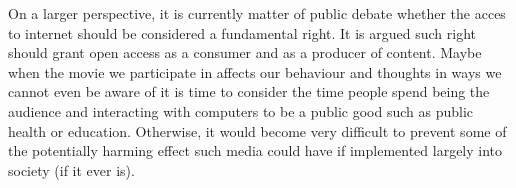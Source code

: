 \documentclass[
		twoside,openright,titlepage,numbers=noenddot,manychapters,
		headinclude,%
                footinclude=false,cleardoublepage=empty,
                BCOR=5mm,
		fontsize=11pt, %
                 enabledeprecatedfontcommands]{scrreprt}
\begin{document}

On a larger perspective, it is currently matter of public debate whether the acces to internet should be considered a fundamental right. It is argued such right should grant open access as a consumer and as a producer of content. Maybe when the movie we participate in affects our behaviour and thoughts in ways we cannot even be aware of it is time to consider the time people spend being the audience and interacting with computers to be a public good such as public health or education. %
Otherwise, it would become very difficult to prevent some of the potentially harming effect such media could have if implemented largely into society (if it ever is).  
\end{document}
